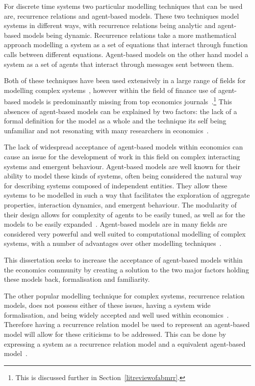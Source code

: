 \documentclass{article}
\begin{document}
For discrete time systems two particular modelling techniques that can be used are, recurrence relations and agent-based models. These two techniques model systems in different ways, with recurrence relations being analytic and agent-based models being dynamic. Recurrence relations take a more mathematical approach modelling a system as a set of equations that interact through function calls between different equations. Agent-based models on the other hand model a system as a set of agents that interact through messages sent between them.    

Both of these techniques have been used extensively in a large range of fields for modelling complex systems~\cite{wsabm}, however within the field of finance use of agent-based models is predominantly missing from top economics journals~\cite{whereabmp, farmerfoleynature}.\footnote{This is discussed further in Section~\ref{litreviewofabmrr}.} This absences of agent-based models can be explained by two factors: the lack of a formal definition for the model as a whole and the technique its self being unfamiliar and not resonating with many researchers in economics~\cite{farmerfoleynature}. 

The lack of widespread acceptance of agent-based models within economics can cause an issue for the development of work in this field on complex interacting systems and emergent behaviour. Agent-based models are well known for their ability to model these kinds of systems, often being considered the natural way for describing systems composed of independent entities. They allow these systems to be modelled in such a way that facilitates the exploration of aggregate properties, interaction dynamics, and emergent behaviour. The modularity of their design allows for complexity of agents to be easily tuned, as well as for the models to be easily expanded~\cite{techsadsProbsabm}. Agent-based models are in many fields are considered very powerful and well suited to computational modelling of complex systems, with a number of advantages over other modelling techniques~\cite{whereabmp, abmgood1, abmgreat2, gabm3, gabm5}. 

This dissertation seeks to increase the acceptance of agent-based models within the economics community by creating a solution to the two major factors holding these models back, formalisation and familiarity. 

The other popular modelling technique for complex systems, recurrence relation models, does not possess either of these issues, having a system wide formalisation, and being widely accepted and well used within economics~\cite{acrr, rra10, rra1}. Therefore having a recurrence relation model be used to represent an agent-based model will allow for these criticisms to be addressed. This can be done by expressing a system as a recurrence relation model and a equivalent agent-based model~\cite{agbtorrgood}. 
\end{document}
